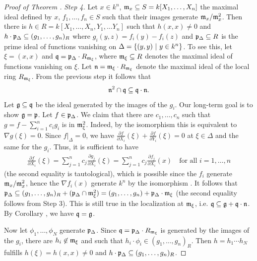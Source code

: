\documentclass[a4paper,parskip=half,numbers=enddot, DIV=12]{scrreprt}
\begin{document}
\begin{proof}[Proof of Theorem ]
    \emph{Step 4.} Let $x\in k^n$, $\mathfrak{m}_x \subseteq S= k[X_1,\ldots, X_n]$ the maximal ideal defined by $x$, $f_1,\ldots, f_n\in S$ such that their images generate $\mathfrak{m}_x/\mathfrak{m}_x^2$. Then there is $h\in R = k[X_1,\ldots, X_n,Y_1,\ldots Y_n]$ such that $h(x,x) \neq 0$ and $h\cdot \mathfrak{p}_\Delta \subseteq (g_1,\ldots, g_n)_R$ where $g_i(y,z) = f_i(y)-f_i(z)$ and $\mathfrak{p}_\Delta\subseteq R$ is the prime ideal of functions vanishing on $\Delta = \left\{(y,y)\ \middle|\  y\in k^n\right\}$. To see this, let $\xi = (x,x)$ and $\mathfrak{q} = \mathfrak{p}_\Delta \cdot R_{\mathfrak{m}_\xi}$, where $\mathfrak{m}_\xi\subseteq R$ denotes the maximal ideal of functions vanishing on $\xi$. Let $\mathfrak{n} = \mathfrak{m}_\xi\cdot R_{\mathfrak{m}_\xi}$ denote the maximal ideal of the local ring $R_{\mathfrak{m}_\xi}$. From the previous step it follows that 
    \begin{align}\lbl{eq:thm15}
        \nn^2\cap \qq\subseteq \qq\cdot \nn .
    \end{align}
    Let $\mathfrak{g}\subseteq \mathfrak{q}$ be the ideal generated by the images of the $g_i$. Our long-term goal is to show $\mathfrak{g}=\mathfrak{p}$. Let $f\in \mathfrak{p}_\Delta$. We claim that there are $c_1,\ldots,c_n$ such that $g=f-\sum_{i=1}^n c_i g_i$ is in $\mathfrak{m}_\xi^2$. Indeed, by the isomorphism  this is equivalent to $\nabla g(\xi)=0$. Since $f|_\Delta = 0$, we have $\frac{\partial f}{\partial X_i}(\xi) + \frac{\partial f}{\partial Y_i}(\xi) = 0$ at $\xi\in \Delta$ and the same for the $g_i$. Thus, it is sufficient to have 
    \begin{align*}
        \frac{\partial f}{\partial X_i}(\xi) = \sum_{j=1}^n c_j \frac{\partial g_j}{\partial X_i}(\xi) = \sum_{j=1}^n c_j \frac{\partial f_j}{\partial X_i}(x)\quad\text{for all }i=1,\ldots,n
    \end{align*}
    (the second equality is tautological), which is possible since the $f_i$ generate $\mathfrak{m}_x/\mathfrak{m}_x^2$, hence the $\nabla f_i(x)$ generate $k^n$ by the isomorphism . It follows that $\mathfrak{p}_\Delta\subseteq (g_1,\ldots,g_n)_R + (\mathfrak{p}_\Delta\cap \mathfrak{m}_\xi^2) = (g_1,\ldots,g_n) + \mathfrak{p}_\Delta\cdot \mathfrak{m}_\xi$ (the second equality follows from Step 3). This is still true in the localization at $\mathfrak{m}_\xi$, i.e. $\mathfrak{q}\subseteq \mathfrak{g} +\mathfrak{q}\cdot\mathfrak{n}$. By Corollary , we have $\mathfrak{q}= \mathfrak{g}$. 
    
    Now let $\phi_1,\ldots,\phi_N$ generate $\mathfrak{p}_\Delta$. Since $\mathfrak{q} =\mathfrak{p}_\Delta\cdot R_{\mathfrak{m}_\xi}$ is generated by the images of the $g_i$, there are $h_i\not\in \mathfrak{m}_\xi$ and such that $h_i\cdot \phi_i \in(g_1,\ldots,g_n)_R$. Then $h=h_1\cdots h_N$ fulfills $h(\xi)=h(x,x)\not=0$ and $h\cdot\mathfrak{p}_\Delta\subseteq(g_1,\ldots,g_n)_R$.
    

\end{proof}
\end{document}
